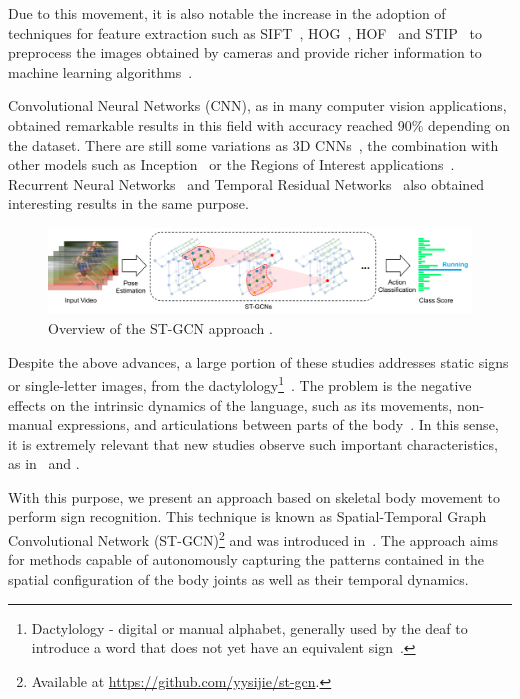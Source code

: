 Due to this movement, it is also notable the increase in the adoption of techniques for feature extraction such as SIFT~\cite{lowe-2004}, HOG~\cite{dalal-2005}, HOF~\cite{laptev-2008} and STIP~\cite{laptev-2008} to preprocess the images obtained by cameras and provide richer information to machine learning algorithms~\cite{lim-2016,shanta-2018}.

Convolutional Neural Networks (CNN), as in many computer vision applications, obtained remarkable results in this field with accuracy reached 90\% \cite{shanta-2018,ji-2017,taskiran-2018,rao-2018} depending on the dataset. There are still some variations as 3D CNNs~\cite{elbadawy-2017}, the combination with other models such as Inception~\cite{das-2018} or the Regions of Interest applications~\cite{sajanraj-2018}. Recurrent Neural Networks~\cite{konstantinidis-2018} and Temporal Residual Networks~\cite{pigou-2017} also obtained interesting results in the same purpose.

\begin{figure}[!ht]
    \centering
    \includegraphics[width=1.0\textwidth]{images/st_gcn_workflow}
    \caption{Overview of the ST-GCN approach \cite[p. 3]{st-gcn-2018}.}
    \label{fig:st-gcn-workflow}
\end{figure}

Despite the above advances, a large portion of these studies addresses static signs or single-letter images, from the dactylology\footnote{Dactylology - digital or manual alphabet, generally used by the deaf to introduce a word that does not yet have an equivalent sign~\cite{quadros-2004,pereira-choi-2011}.
}~\cite{shanta-2018,taskiran-2018,elbadawy-2017,das-2018,sajanraj-2018}. The problem is the negative effects on the intrinsic dynamics of the language, such as its movements, non-manual expressions, and articulations between parts of the body~\cite{quadros-2004}. In this sense, it is extremely relevant that new studies observe such important characteristics, as in~\cite{konstantinidis-2018} and \cite {pigou-2017}.

With this purpose, we present an approach based on skeletal body movement to perform sign recognition. This technique is known as Spatial-Temporal Graph Convolutional Network (ST-GCN)\footnote {Available at \url{https://github.com/yysijie/st-gcn}.} and was introduced in~\cite{st-gcn-2018}. The approach aims for methods capable of autonomously capturing the patterns contained in the spatial configuration of the body joints as well as their temporal dynamics. %

